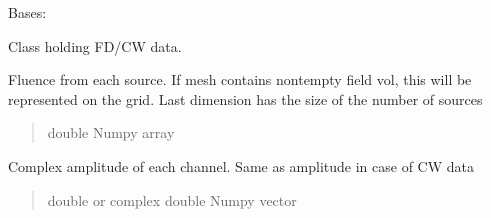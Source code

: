 \documentclass[letterpaper,10pt,english]{sphinxmanual}
\begin{document}
\begin{fulllineitems}
\label{\detokenize{_autosummary/nirfasterff.base.data.FDdata:nirfasterff.base.data.FDdata}}
\pysigstartsignatures
{}
\pysigstopsignatures
\sphinxAtStartPar
Bases: 

\sphinxAtStartPar
Class holding FD/CW data.

\begin{fulllineitems}
\label{\detokenize{_autosummary/nirfasterff.base.data.FDdata:nirfasterff.base.data.FDdata.phi}}
\pysigstartsignatures
{}
\pysigstopsignatures
\sphinxAtStartPar
Fluence from each source. If mesh contains non\sphinxhyphen{}tempty field vol, this will be represented on the grid. Last dimension has the size of the number of sources
\begin{quote}\begin{description}
\sphinxAtStartPar
double Numpy array

\end{description}\end{quote}

\end{fulllineitems}


\begin{fulllineitems}
\label{\detokenize{_autosummary/nirfasterff.base.data.FDdata:nirfasterff.base.data.FDdata.complex}}
\pysigstartsignatures
{}
\pysigstopsignatures
\sphinxAtStartPar
Complex amplitude of each channel. Same as amplitude in case of CW data
\begin{quote}\begin{description}
\sphinxAtStartPar
double or complex double Numpy vector

\end{description}\end{quote}

\end{fulllineitems}



\end{fulllineitems}
\end{document}
